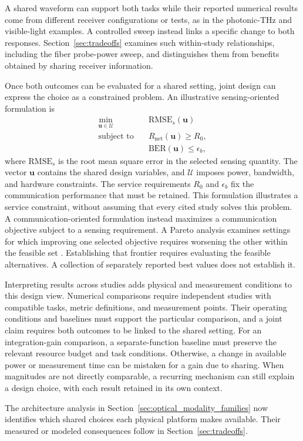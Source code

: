A shared waveform can support both tasks while their reported numerical
results come from different receiver configurations or tests, as in the
photonic-THz and visible-light examples. A controlled sweep instead links a
specific change to both responses. Section~\ref{sec:tradeoffs} examines such
within-study relationships, including the fiber probe-power sweep, and
distinguishes them from benefits obtained by sharing receiver information.

Once both outcomes can be evaluated for a shared setting, joint design can
express the choice as a constrained problem. An illustrative
sensing-oriented formulation is
\begin{equation}
\begin{aligned}
\min_{\boldsymbol{u}\in\mathcal{U}}\quad&
\mathrm{RMSE}_{s}(\boldsymbol{u})\\
\text{subject to}\quad&
R_{\mathrm{net}}(\boldsymbol{u})\geq R_0,\\
&\mathrm{BER}(\boldsymbol{u})\leq\epsilon_b ,
\end{aligned}
\label{eq:joint_design_service_floor}
\end{equation}
where $\mathrm{RMSE}_{s}$ is the root mean square error in the selected
sensing quantity. The vector $\boldsymbol{u}$ contains the shared design variables, and
$\mathcal{U}$ imposes power, bandwidth, and hardware constraints.
The service requirements $R_0$ and $\epsilon_b$ fix the communication
performance that must be retained. This formulation illustrates a service
constraint, without assuming that every cited study solves this problem.
A communication-oriented formulation instead maximizes a communication
objective subject to a sensing requirement. A Pareto analysis examines
settings for which improving one selected objective requires worsening the
other within the feasible set
\cite{Wen2024OISACArchitectures,Lyu2026PhotonicTHzWaveforms}.
Establishing that frontier requires evaluating the feasible alternatives.
A collection of separately reported best values does not establish it.

Interpreting results across studies adds physical and measurement conditions
to this design view. Numerical comparisons require independent studies with
compatible tasks, metric definitions, and measurement points. Their operating
conditions and baselines must support the particular comparison, and a joint
claim requires both outcomes to be linked to the shared setting.
For an integration-gain comparison, a separate-function baseline must preserve
the relevant resource budget and task conditions. Otherwise, a change in
available power or measurement time can be mistaken for a gain due to sharing.
When magnitudes are not directly comparable, a recurring mechanism can still
explain a design choice, with each result retained in its own context.

The architecture analysis in Section~\ref{sec:optical_modality_families}
now identifies which shared choices each physical platform makes available.
Their measured or modeled consequences follow in Section~\ref{sec:tradeoffs}.
